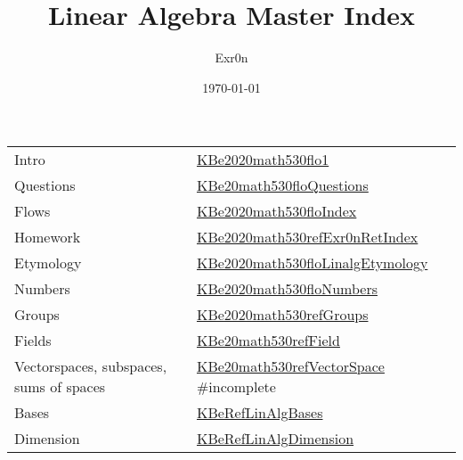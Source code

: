 \documentclass[letterpaper]{article}
\author{Exr0n}
\date{\today}
\title{Linear Algebra Master Index}
\renewcommand{\tableofcontents}{}
\begin{document}
\tableofcontents

\begin{center}
\begin{tabular}{ll}
Intro & \href{KBe2020math530flo1.org}{KBe2020math530flo1}\\
Questions & \href{KBe20math530floQuestions.org}{KBe20math530floQuestions}\\
Flows & \href{KBe2020math530floIndex.org}{KBe2020math530floIndex}\\
Homework & \href{KBe2020math530refExr0nRetIndex.org}{KBe2020math530refExr0nRetIndex}\\
Etymology & \href{KBe2020math530floLinalgEtymology.org}{KBe2020math530floLinalgEtymology}\\
Numbers & \href{KBe2020math530floNumbers.org}{KBe2020math530floNumbers}\\
Groups & \href{KBe2020math530refGroups.org}{KBe2020math530refGroups}\\
Fields & \href{KBe20math530refField.org}{KBe20math530refField}\\
Vectorspaces, subspaces, sums of spaces & \href{KBe20math530refVectorSpace.org}{KBe20math530refVectorSpace} \#incomplete\\
Bases & \href{KBeRefLinAlgBases.org}{KBeRefLinAlgBases}\\
Dimension & \href{KBeRefLinAlgDimension.org}{KBeRefLinAlgDimension}\\
\end{tabular}
\end{center}
\end{document}
